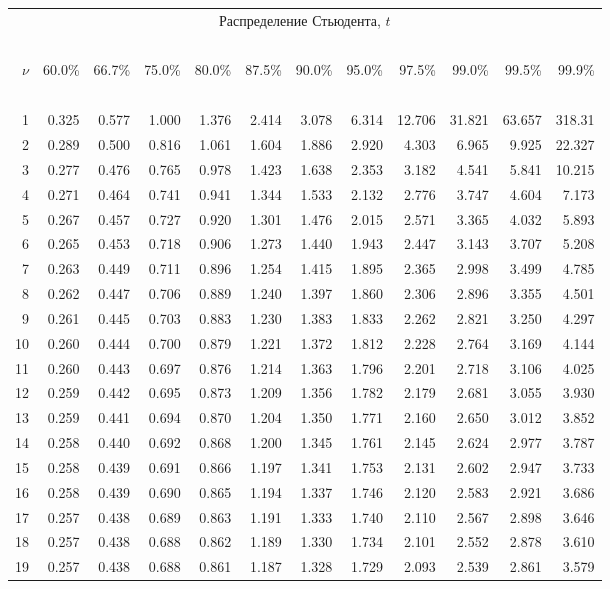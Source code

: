\documentclass[pdftex,11pt,openany]{book}\usepackage[]{graphicx}\usepackage[]{color}
\begin{document}
{\begin{center}
\begin{tabular}
      {r@{\quad}r@{\,}r@{\,}r@{\,}r@{\,}r@{\,}r@{\,}r@{\,}r@{\,}r@{\,}r@{\,}r}
\multicolumn{12}{c}{Распределение Стьюдента, $t$} \\
\ \\
$\nu$&60.0\%&66.7\%&75.0\%&80.0\%&87.5\%&90.0\%&95.0\%&97.5\%&99.0\%&99.5\%
     &99.9\% \\
\ \\
 1&0.325&0.577&1.000&1.376&2.414&3.078&6.314&12.706&31.821&63.657&318.31 \\
 2&0.289&0.500&0.816&1.061&1.604&1.886&2.920&4.303&6.965&9.925&22.327 \\
 3&0.277&0.476&0.765&0.978&1.423&1.638&2.353&3.182&4.541&5.841&10.215 \\
 4&0.271&0.464&0.741&0.941&1.344&1.533&2.132&2.776&3.747&4.604&7.173 \\
 5&0.267&0.457&0.727&0.920&1.301&1.476&2.015&2.571&3.365&4.032&5.893 \\
 6&0.265&0.453&0.718&0.906&1.273&1.440&1.943&2.447&3.143&3.707&5.208 \\
 7&0.263&0.449&0.711&0.896&1.254&1.415&1.895&2.365&2.998&3.499&4.785 \\
 8&0.262&0.447&0.706&0.889&1.240&1.397&1.860&2.306&2.896&3.355&4.501 \\
 9&0.261&0.445&0.703&0.883&1.230&1.383&1.833&2.262&2.821&3.250&4.297 \\
10&0.260&0.444&0.700&0.879&1.221&1.372&1.812&2.228&2.764&3.169&4.144 \\
11&0.260&0.443&0.697&0.876&1.214&1.363&1.796&2.201&2.718&3.106&4.025 \\
12&0.259&0.442&0.695&0.873&1.209&1.356&1.782&2.179&2.681&3.055&3.930 \\
13&0.259&0.441&0.694&0.870&1.204&1.350&1.771&2.160&2.650&3.012&3.852 \\
14&0.258&0.440&0.692&0.868&1.200&1.345&1.761&2.145&2.624&2.977&3.787 \\
15&0.258&0.439&0.691&0.866&1.197&1.341&1.753&2.131&2.602&2.947&3.733 \\
16&0.258&0.439&0.690&0.865&1.194&1.337&1.746&2.120&2.583&2.921&3.686 \\
17&0.257&0.438&0.689&0.863&1.191&1.333&1.740&2.110&2.567&2.898&3.646 \\
18&0.257&0.438&0.688&0.862&1.189&1.330&1.734&2.101&2.552&2.878&3.610 \\
19&0.257&0.438&0.688&0.861&1.187&1.328&1.729&2.093&2.539&2.861&3.579 \\

\end{tabular}
\end{center}}
\end{document}
